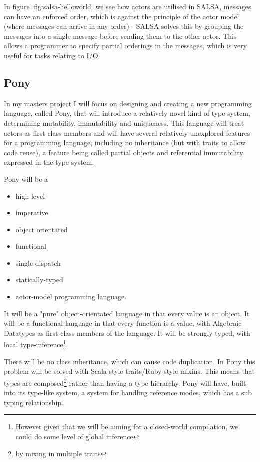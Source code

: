 \documentclass{article}
\begin{document}
In figure \ref{fig:salsa-helloworld} we see how actors are utilised in SALSA,
messages can have an enforced order, which is against the principle of the
actor model (where messages can arrive in any order) - SALSA solves this
by grouping the messages into a single message before sending them to the
other actor. This allows a programmer to specify partial orderings in the
messages, which is very useful for tasks relating to I/O.

\subsection{Pony}

In my masters project I will focus on designing and creating a new programming
language, called Pony, that will introduce a relatively novel kind of type system,
determining mutability, immutability and uniqueness. This language will treat
actors as first class members and will have several relatively unexplored
features for a programming language, including no inheritance (but with traits
to allow code reuse), a feature being called partial objects and referential
immutability expressed in the type system.

Pony will be a
\begin{itemize}
\item high level
\item imperative
\item object orientated
\item functional
\item single-dispatch
\item statically-typed
\item actor-model programming language.
\end{itemize}
It will be a "pure" object-orientated language in that every value is an object.
It will be a functional language in that every function is a value, with
Algebraic Datatypes as first class members of the language. It will be strongly
typed, with local type-inference\footnote{However given that we will be aiming
for a closed-world compilation, we could do some level of global inference}.

There will be no class inheritance, which can cause code duplication. In Pony
this problem will be solved with Scala-style traits/Ruby-style mixins. This
means that types are composed\footnote{by mixing in multiple traits} rather than
having a type hierarchy. Pony will have, built into its type-like system, a system
for handling reference modes, which has a sub typing relationship.
\end{document}
